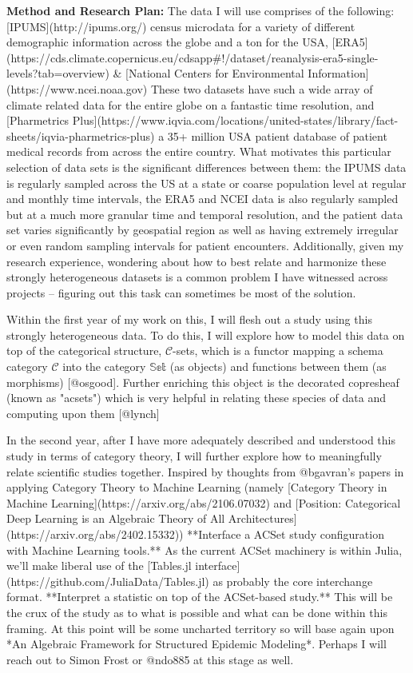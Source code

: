 \documentclass[11pt]{extarticle}
\begin{document}
\textbf{Method and Research Plan:} The data I will use comprises of the following: [IPUMS](http://ipums.org/) census microdata for a variety of different demographic information across the globe and a ton for the USA, [ERA5](https://cds.climate.copernicus.eu/cdsapp#!/dataset/reanalysis-era5-single-levels?tab=overview) & [National Centers for Environmental Information](https://www.ncei.noaa.gov) These two datasets have such a wide array of climate related data for the entire globe on a fantastic time resolution, and [Pharmetrics Plus](https://www.iqvia.com/locations/united-states/library/fact-sheets/iqvia-pharmetrics-plus) a 35+ million USA patient database of patient medical records from across the entire country.
What motivates this particular selection of data sets is the significant differences between them: the IPUMS data is regularly sampled across the US at a state or coarse population level at regular and monthly time intervals, the ERA5 and NCEI data is also regularly sampled but at a much more granular time and temporal resolution, and the patient data set varies significantly by geospatial region as well as having extremely irregular or even random sampling intervals for patient encounters.
Additionally, given my research experience, wondering about how to best relate and harmonize these strongly heterogeneous datasets is a common problem I have witnessed across projects -- figuring out this task can sometimes be most of the solution.

Within the first year of my work on this, I will flesh out a study using this strongly heterogeneous data.
To do this, I will explore how to model this data on top of the categorical structure, $\mathscr{C}$-sets, which is a functor mapping a schema category $\mathscr{C}$ into the category $\mathbb{Set}$ (as objects) and functions between them (as morphisms) [@osgood].
Further enriching this object is the decorated copresheaf (known as "acsets") which is very helpful in relating these species of data and computing upon them [@lynch]

In the second year, after I have more adequately described and understood this study in terms of category theory, I will further explore how to meaningfully relate scientific studies together.
Inspired by thoughts from @bgavran's papers in applying Category Theory to Machine Learning (namely [Category Theory in Machine Learning](https://arxiv.org/abs/2106.07032) and [Position: Categorical Deep Learning is an Algebraic Theory of All Architectures](https://arxiv.org/abs/2402.15332)) 
**Interface a ACSet study configuration with Machine Learning tools.** As the current ACSet machinery is within Julia, we'll make liberal use of the [Tables.jl interface](https://github.com/JuliaData/Tables.jl) as probably the core interchange format.
**Interpret a statistic on top of the ACSet-based study.** This will be the crux of the study as to what is possible and what can be done within this framing. At this point will be some uncharted territory so will base again upon *An Algebraic Framework for Structured Epidemic Modeling*. Perhaps I will reach out to Simon Frost or @ndo885 at this stage as well.
\end{document}
